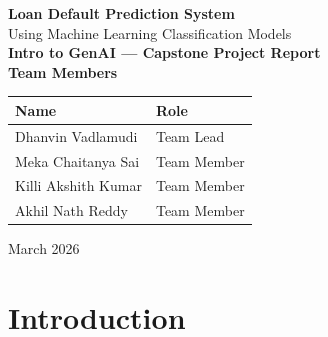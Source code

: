 \documentclass[12pt, a4paper]{article}
\begin{document}
\begin{titlepage}
  \centering
  \vspace*{2cm}

  {\LARGE\bfseries Loan Default Prediction System}\\[0.5cm]
  {\Large Using Machine Learning Classification Models}\\[2cm]

  {\large\textbf{Intro to GenAI --- Capstone Project Report}}\\[2.5cm]

  {\large\textbf{Team Members}}\\[0.5cm]
  \begin{tabular}{l l}
    \toprule
    \textbf{Name} & \textbf{Role} \\
    \midrule
    Dhanvin Vadlamudi   & Team Lead \\
    Meka Chaitanya Sai  & Team Member \\
    Killi Akshith Kumar & Team Member \\
    Akhil Nath Reddy    & Team Member \\
    \bottomrule
  \end{tabular}

  \vfill

  {\large March 2026}

\end{titlepage}

\newpage
\begin{abstract}
Loan defaults are a significant financial risk for lending institutions. In this project, we built an end-to-end machine learning system to predict whether a loan applicant is likely to default. We used a Kaggle dataset of 45,000 loan records with 13 features and trained three classification models: Logistic Regression (baseline), Decision Tree (intermediate), and XGBoost (advanced). After handling class imbalance and tuning hyperparameters, XGBoost achieved the best performance with 91.27\% accuracy, 0.82 F1-Score, and 0.98 ROC-AUC. The system was deployed as a Streamlit web application that allows users to input applicant profiles and receive real-time default probability predictions with risk classification.
\end{abstract}

\vspace{1cm}
\tableofcontents
\newpage

\section{Introduction}
\end{document}
